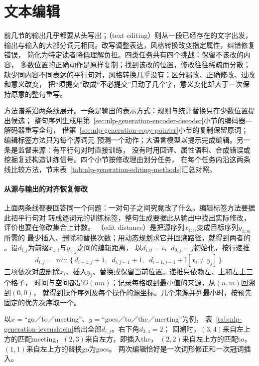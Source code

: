 \section{文本编辑}
\label{sec:nlp-generation-editing}

前几节的输出几乎都要从头写出；（text editing）则从一段已经存在的文字出发，
输出与输入的大部分词元相同。改写调整表达，风格转换改变指定属性，纠错修复错误，
简化为特定读者降低理解负担。四类任务共有四个挑战：保留不该改的内容，
多数位置的正确动作是原样复制；找到该改的位置，修改往往稀疏而分散；
缺少同内容不同表达的平行句对，风格转换几乎没有；区分漏改、正确修改、过改和意义改变，
把“须提交”改成“不必提交”只动了几个字，意义变化却大于一次保持原意的整句重写。

方法谱系沿两条线展开。一条是输出的表示方式：规则与统计替换只在少数位置提出候选；
整句序列生成用第~\ref{sec:nlp-generation-encoder-decoder}小节的编码器—解码器重写全句，
借第~\ref{sec:nlp-generation-copy-pointer}小节的复制保留原词；编辑标签方法只为每个源词元
预测一个动作；大语言模型以提示完成编辑。另一条是监督来源：有平行句对时直接训练，
没有时用回译、属性语料、合成错误或挖掘复述构造训练信号。四个小节按修改理由划分任务，
在每个任务内沿这两条线比较方法，节末表~\ref{tab:nlp-generation-editing-methods}汇总对照。

\paragraph{从源与输出的对齐恢复修改}
上面两条线都要回答同一个问题：一对句子之间究竟改了什么。编辑标签方法要据此把平行句对
转成逐词元的训练标签，整句生成要据此从输出中找出实际修改，评价也要在修改集合上计数。
（edit distance）是把源序列$x_{1:n}$变成目标序列$y_{1:m}$所需的
最少插入、删除和替换次数；用动态规划求它并回溯路径，就得到两者的
。设$d_{i,j}$为前缀$x_{1:i}$与$y_{1:j}$之间的编辑距离，
以$d_{i,0}=i$、$d_{0,j}=j$初始化，按行递推
\begin{equation}
  d_{i,j}=\min\bigl\{\,d_{i-1,j}+1,\;\; d_{i,j-1}+1,\;\;
  d_{i-1,j-1}+\mathbb{I}[x_i\neq y_j]\,\bigr\}.
  \label{eq:nlp-generation-edit-distance}
\end{equation}
三项依次对应删除$x_i$、插入$y_j$、替换或保留当前位置。递推只依赖左、上和左上三个格子，
时间与空间都是$O(nm)$；记录每格取到最小值的来源，从$(n,m)$回溯到$(0,0)$，
就得到操作序列及每个操作的源坐标。几个来源并列最小时，按预先固定的优先次序取一个。

以$x=$“go／to／meeting”、$y=$“goes／to／the／meeting”为例，
表~\ref{tab:nlp-generation-levenshtein}给出全部$d_{i,j}$。右下角$d_{3,4}=2$；
回溯时，$(3,4)$来自左上方的匹配meeting，$(2,3)$来自左方，即插入the，
$(2,2)$来自左上方的匹配to，$(1,1)$来自左上方的替换go为goes。
两次编辑恰好是一次词形修正和一次冠词插入。

